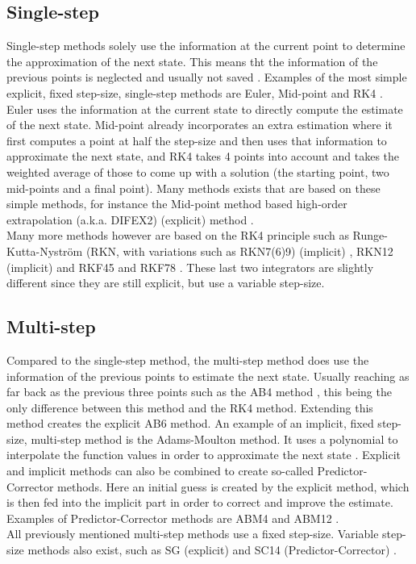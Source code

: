 \subsection{Single-step}
\label{subsec:singleStep}
Single-step methods solely use the information at the current point to determine the approximation of the next state. This means tht the information of the previous points is neglected and usually not saved \citep{noomen2013int}. Examples of the most simple explicit, fixed step-size, single-step methods are Euler, Mid-point and \ac{RK4} \citep{hofsteenge2013}. Euler uses the information at the current state to directly compute the estimate of the next state. Mid-point already incorporates an extra estimation where it first computes a point at half the step-size and then uses that information to approximate the next state, and \ac{RK4} takes 4 points into account and takes the weighted average of those to come up with a solution (the starting point, two mid-points and a final point). Many methods exists that are based on these simple methods, for instance the Mid-point method based high-order extrapolation (a.k.a. DIFEX2) (explicit) method \citep{deuflhard1994}.\\
Many more methods however are based on the \ac{RK4} principle such as Runge-Kutta-Nystr\"{o}m (RKN, with variations such as RKN7(6)9) (implicit) \citep{montenbruck1992,dormand1987}, \ac{RKN12} (implicit) \citep{montenbruck1992}  and \acf{RKF45} and \acf{RKF78} \citep{fehlberg1969,fehlberg1968}. These last two integrators are slightly different since they are still explicit, but use a variable step-size.


\subsection{Multi-step}
\label{subsec:multiStep}
Compared to the single-step method, the multi-step method does use the information of the previous points to estimate the next state. Usually reaching as far back as the previous three points such as the \ac{AB4} method \citep{noomen2013int}, this being the only difference between this method and the \ac{RK4} method. Extending this method creates the explicit \ac{AB6} method. An example of an implicit, fixed step-size, multi-step method is the Adams-Moulton method. It uses a polynomial to interpolate the function values in order to approximate the next state \citep{noomen2013int}. Explicit and implicit methods can also be combined to create so-called Predictor-Corrector methods. Here an initial guess is created by the explicit method, which is then fed into the implicit part in order to correct and improve the estimate. Examples of Predictor-Corrector methods are \ac{ABM4} and \ac{ABM12} \citep{noomen2013int,montenbruck1992}. \\
All previously mentioned multi-step methods use a fixed step-size. Variable step-size methods also exist, such as \ac{SG} (explicit) \citep{berry2004,meijaard1991} and \ac{SC14} (Predictor-Corrector) \citep{berry2004,ramos2005}.


